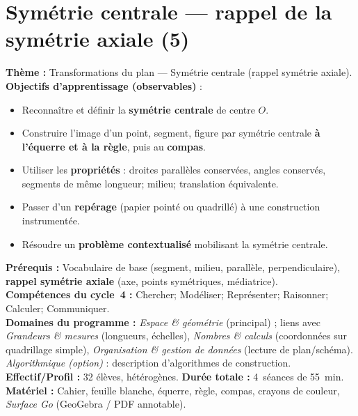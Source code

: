 \chapter{Symétrie centrale — rappel de la symétrie axiale (5\ieme)}
\label{chap:symetrie_centrale}

\begin{tcolorbox}[title=\large Résumé de la séquence]
	\textbf{Thème :} Transformations du plan — Symétrie centrale (rappel symétrie axiale).\\
	\textbf{Objectifs d’apprentissage (observables)} :
	\begin{itemize}
		\item Reconnaître et définir la \textbf{symétrie centrale} de centre $O$.
		\item Construire l’image d’un point, segment, figure par symétrie centrale \textbf{à l’équerre et à la règle}, puis au \textbf{compas}.
		\item Utiliser les \textbf{propriétés} : droites parallèles conservées, angles conservés, segments de même longueur; milieu; translation équivalente.
		\item Passer d’un \textbf{repérage} (papier pointé ou quadrillé) à une construction instrumentée.
		\item Résoudre un \textbf{problème contextualisé} mobilisant la symétrie centrale.
	\end{itemize}
	\textbf{Prérequis :} Vocabulaire de base (segment, milieu, parallèle, perpendiculaire), \textbf{rappel symétrie axiale} (axe, points symétriques, médiatrice).\\
	\textbf{Compétences du cycle~4 :} Chercher; Modéliser; Représenter; Raisonner; Calculer; Communiquer.\\
	\textbf{Domaines du programme :} \emph{Espace \& géométrie} (principal) ; liens avec \emph{Grandeurs \& mesures} (longueurs, échelles), \emph{Nombres \& calculs} (coordonnées sur quadrillage simple), \emph{Organisation \& gestion de données} (lecture de plan/schéma). \emph{Algorithmique (option)} : description d’algorithmes de construction.\\
	\textbf{Effectif/Profil :} 32 élèves, hétérogènes. \textbf{Durée totale :} 4~séances de 55~min.\\
	\textbf{Matériel :} Cahier, feuille blanche, équerre, règle, compas, crayons de couleur, \textit{Surface Go} (GeoGebra / PDF annotable).
\end{tcolorbox}

